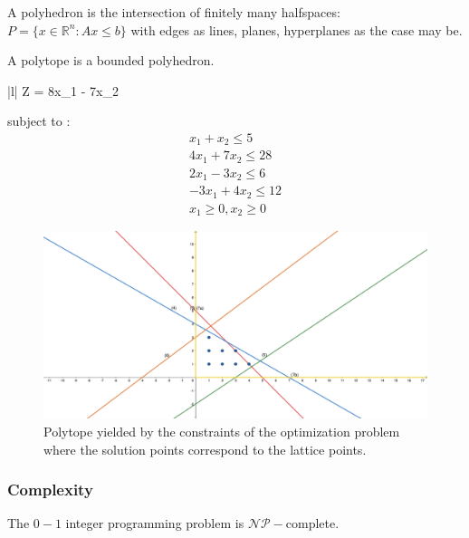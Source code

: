 \begin{defn}
A polyhedron is the intersection of finitely many halfspaces: $P = \{x \in \mathbb{R}^{n} : Ax \leq b\}$ with edges as lines, planes, hyperplanes as the case may be.
\end{defn}

\begin{defn}
A polytope is a bounded polyhedron.
\end{defn}
\begin{example}
    \begin{maxi!}|l|
	  {}{Z = 8x_1 - 7x_2}{}{}
    \end{maxi!}
subject to : 
\begin{gather}
    x_1 + x_2 \leq 5 \\
    4x_1 + 7x_2 \leq 28 \\
    2x_1 - 3x_2 \leq 6 \\
    -3x_1 + 4x_2 \leq  12 \\
    x_1 \geq 0, x_2 \geq 0
\end{gather}
\end{example}

    \begin{figure}[H]
    \centering
    \includegraphics[width=1.0\textwidth]{res/integerp.pdf}
    \caption{Polytope yielded by the constraints of the optimization problem where the solution points correspond to the lattice points.}
    \label{fig:circle}
    \end{figure}

\subsubsection{Complexity}
\begin{theorem}
The $0-1$ integer programming problem is $\mathcal{NP}-$complete.
\end{theorem}


